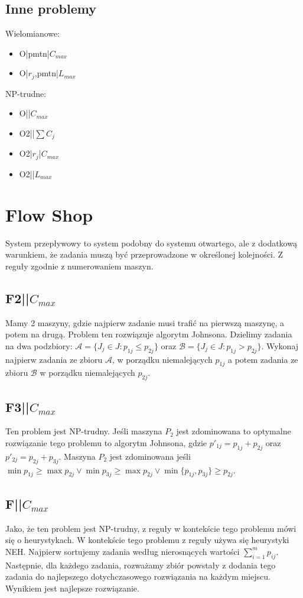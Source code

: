 \documentclass{../notatki}
\begin{document}
\subsection{Inne problemy}

Wielomianowe:
\begin{itemize}
  \item O|pmtn|$C_{max}$
  \item O|$r_j$,pmtn|$L_{max}$
\end{itemize}
NP-trudne:
\begin{itemize}
  \item O||$C_{max}$
  \item O2||$\sum C_j$
  \item O2|$r_j$|$C_{max}$
  \item O2||$L_{max}$
\end{itemize}

\section{Flow Shop}

System przepływowy to system podobny do systemu otwartego, ale z dodatkową
warunkiem, że zadania muszą być przeprowadzone w określonej kolejności.
Z reguły zgodnie z numerowaniem maszyn.

\subsection{F2||\texorpdfstring{$C_{max}$}{Cmax}}

Mamy 2 maszyny, gdzie najpierw zadanie musi trafić na pierwszą maszynę,
a potem na drugą. Problem ten rozwiązuje algorytm Johnsona. Dzielimy
zadania na dwa podzbiory: $\mathcal{A} = \{J_j \in J : p_{1j} \le p_{2j}\}$
oraz $\mathcal{B} =\{J_j \in J: p_{1j} > p_{2j}\}$. Wykonaj najpierw zadania
ze zbioru $\mathcal{A}$, w porządku niemalejących $p_{1j}$ a potem
zadania ze zbioru $\mathcal{B}$ w porządku niemalejących $p_{2j}$.

\subsection{F3||\texorpdfstring{$C_{max}$}{Cmax}}

Ten problem jest NP-trudny. Jeśli maszyna $P_2$ jest zdominowana to optymalne
rozwiązanie tego problemu to algorytm Johnsona, gdzie $p'_{1j} =
p_{1j} + p_{2j}$ oraz $p'_{2j} = p_{2j} + p_{3j}$. Maszyna $P_2$ jest
zdominowana jeśli
$\min p_{1j} \ge \max p_{2j} \vee \min p_{3j} \ge \max p_{2j} \vee
\min\{p_{1j},p_{3j}\} \ge p_{2j}$.

\subsection{F||\texorpdfstring{$C_{max}$}{Cmax}}

Jako, że ten problem jest NP-trudny, z reguły w kontekście tego problemu
mówi się o heurystykach. W kontekście tego problemu z reguły używa
się heurystyki NEH. Najpierw sortujemy zadania według nierosnących wartości
$\sum_{i=1}^m p_{ij}$. Następnie, dla każdego zadania, rozważamy zbiór
powstały z dodania tego zadania do najlepszego dotychczasowego rozwiązania na
każdym miejscu. Wynikiem jest najlepsze rozwiązanie.
\end{document}
